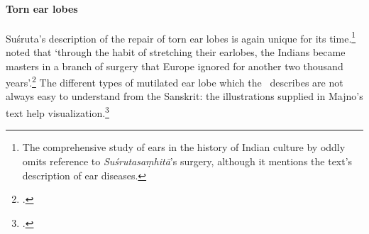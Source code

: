 
%



\paragraph{Torn ear lobes}

Suśruta's description of the repair of torn ear lobes is again unique for
its time.\footnote{The comprehensive study of ears in the history of Indian culture 
by \citet{boll-2010} oddly omits reference to \emph{Suśrutasaṃhitā}'s surgery, 
although it mentions the text's description of ear diseases.}  
\citeauthor{majn-1975} noted that `through the habit of
stretching their earlobes, the Indians became masters in a branch of surgery
that Europe ignored for another two thousand years'.\footcite[291]{majn-1975}  
The different types of
mutilated ear lobe which the \SS\ describes are not always easy to understand
from the Sanskrit: the illustrations supplied in Majno's text help
visualization.\footcites[290--291]{majn-1975}[reproduced with permission 
in][92--93]{wuja-2003}

